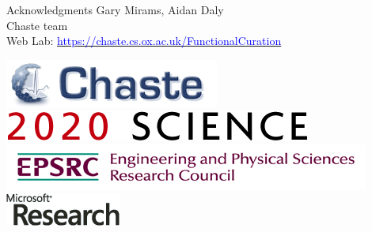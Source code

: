 \documentclass[t,xcolor={usenames,dvipsnames}]{beamer}
\newcommand{\myhref}[2]{\href{#1}{\textcolor{Blue}{#2}}}
\newcommand{\myurl}[1]{\myhref{#1}{#1}}
\begin{document}
\begin{frame}{Acknowledgments}
Gary Mirams, Aidan Daly\\
Chaste team\\

Web Lab: \myurl{https://chaste.cs.ox.ac.uk/FunctionalCuration}

\begin{center}
\includegraphics[scale=.9]{chaste-266x60}\\ \vspace{.3cm}
\includegraphics[scale=.7]{logo2020science}\\ \vspace{.4cm}
\includegraphics[width=.55\textwidth]{EPSRC1RGBLO} \hspace{.1cm}
\includegraphics[scale=.55]{logo_msr}
\end{center}
\end{frame}
\end{document}
